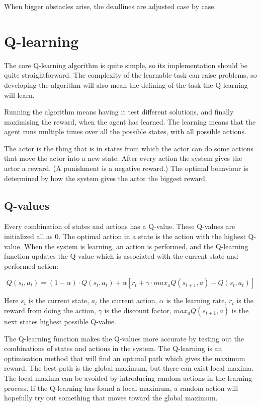 \documentclass{article}
\begin{document}
When bigger obstacles arise, the deadlines are adjusted case by case.



\section{Q-learning}
The core Q-learning algorithm is quite simple, so its implementation should
be quite straightforward. The complexity of the learnable task can raise
problems, so developing the algorithm will also mean the defining of
the task the Q-learning will learn.

Running the algorithm means having it test different solutions, and finally
maximising the reward, when the agent has learned. The learning means
that the agent runs multiple times over all the possible states,
with all possible actions.

The actor is the thing that is in states from which the actor can do some
actions that move the actor into a new state. After every action the
system gives the actor a reward. (A punishment is a negative reward.)
The optimal behaviour is determined by how the system gives the actor the
biggest reward.


\subsection{Q-values}
Every combination of states and actions has a Q-value. These Q-values are
initialized all as 0. The optimal action in a state is the action with the
highest Q-value. When the system is learning, an action is performed, and the
Q-learning function updates the Q-value which is associated with the current
state and performed action:

\[Q(s_t, a_t) = (1 - \alpha) \cdot Q(s_t, a_t) + \alpha
[ r_t + \gamma \cdot max_aQ(s_{t+1}, a) - Q(s_t, a_t) ]\]

Here $s_t$ is the current state, $a_t$ the current action,
$\alpha$ is the learning rate, $r_t$ is the reward from doing the action,
$\gamma$ is the discount factor, $max_aQ(s_{t+1}, a)$ is the next states
highest possible Q-value.

The Q-learning function makes the Q-values more accurate by testing out
the combinations of states and actions in the system. The Q-learning is an
optimisation method that will find an optimal path which gives the maximum
reward. The best path is the global maximum, but there can exist local maxima.
The local maxima can be avoided by introducing random actions in the learning
process. If the Q-learning has found a local maximum, a random action will
hopefully try out something that moves toward the global maximum.
\end{document}
